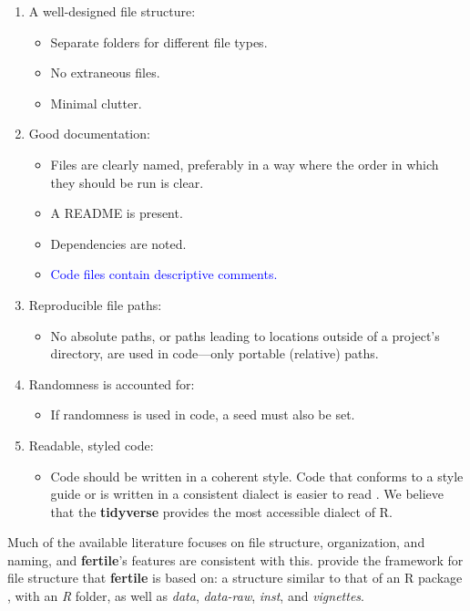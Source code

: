 \documentclass[APA,LATO1COL]{WileyNJD-v2}\usepackage[]{graphicx}\usepackage[]{color}
\newcommand{\R}{\textsf{R}\xspace}
\newcommand{\cmd}[1]{\textit{#1}}
\newcommand{\pkg}[1]{\textbf{#1}}
\begin{document}
\begin{enumerate} [nolistsep]
\item A well-designed file structure:
  \begin{itemize}[noitemsep]
  \item Separate folders for different file types.
  \item No extraneous files.
  \item Minimal clutter.
  \end{itemize}
\item Good documentation:
  \begin{itemize} [noitemsep]
  \item Files are clearly named, preferably in a way where the order in which they should be run is clear.
  \item A README is present.
  \item Dependencies are noted.
  \item \textcolor{blue}{Code files contain descriptive comments.}
  \end{itemize}
\item Reproducible file paths:
  \begin{itemize}
  \item No absolute paths, or paths leading to locations outside of a project's directory, are used in code---only portable (relative) paths.
  \end{itemize}
\item Randomness is accounted for:
  \begin{itemize}
  \item If randomness is used in code, a seed must also be set.
  \end{itemize}
\item Readable, styled code:
  \begin{itemize}
  \item Code should be written in a coherent style. Code that conforms to a style guide or is written in a consistent dialect is easier to read \citep{hermans2017programming}. We believe that the \pkg{tidyverse} provides the most accessible dialect of \R.
  \end{itemize}
\end{enumerate}

Much of the available literature focuses on file structure, organization, and naming, and \pkg{fertile}'s features are consistent with this. \citet{marwick2018packaging} provide the framework for file structure that \pkg{fertile} is based on: a structure similar to that of an \R package \citep{coreteam-extensions, hadley-packages}, with an \cmd{R} folder, as well as \cmd{data}, \cmd{data-raw}, \cmd{inst}, and \cmd{vignettes}.
\end{document}
